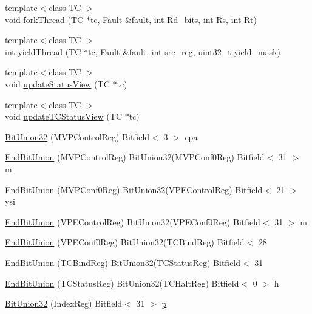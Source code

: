 \begin{DoxyCompactItemize}
\item 
{\footnotesize template$<$class TC $>$ }\\void \hyperlink{namespaceMipsISA_ac90786a66a67e08e3105a5b2f7e8e995}{forkThread} (TC $\ast$tc, \hyperlink{classRefCountingPtr}{Fault} \&fault, int Rd\_\-bits, int Rs, int Rt)
\item 
{\footnotesize template$<$class TC $>$ }\\int \hyperlink{namespaceMipsISA_a93f5e230d4726543a01ed483a2ea4070}{yieldThread} (TC $\ast$tc, \hyperlink{classRefCountingPtr}{Fault} \&fault, int src\_\-reg, \hyperlink{Type_8hh_a435d1572bf3f880d55459d9805097f62}{uint32\_\-t} yield\_\-mask)
\item 
{\footnotesize template$<$class TC $>$ }\\void \hyperlink{namespaceMipsISA_ad0ceebe8e2a7624b4522015586f786d5}{updateStatusView} (TC $\ast$tc)
\item 
{\footnotesize template$<$class TC $>$ }\\void \hyperlink{namespaceMipsISA_a14312b59ae8982e1caf5246e85b2c12b}{updateTCStatusView} (TC $\ast$tc)
\item 
\hyperlink{namespaceMipsISA_a9c38a1dd425d938646c1e57e919ee830}{BitUnion32} (MVPControlReg) Bitfield$<$ 3 $>$ cpa
\item 
\hyperlink{namespaceMipsISA_ad4fdd9ff9306f98fd1cb2811a1ee108f}{EndBitUnion} (MVPControlReg) BitUnion32(MVPConf0Reg) Bitfield$<$ 31 $>$ m
\item 
\hyperlink{namespaceMipsISA_aeff4cebcd774805b052a6d3eaae89d36}{EndBitUnion} (MVPConf0Reg) BitUnion32(VPEControlReg) Bitfield$<$ 21 $>$ ysi
\item 
\hyperlink{namespaceMipsISA_a87885d433cae4e0f9f50680dd02bd7df}{EndBitUnion} (VPEControlReg) BitUnion32(VPEConf0Reg) Bitfield$<$ 31 $>$ m
\item 
\hyperlink{namespaceMipsISA_acdeb651bae709ddc62e0641544f676e8}{EndBitUnion} (VPEConf0Reg) BitUnion32(TCBindReg) Bitfield$<$ 28
\item 
\hyperlink{namespaceMipsISA_a1c829af5069f0e961b7356026c2f45db}{EndBitUnion} (TCBindReg) BitUnion32(TCStatusReg) Bitfield$<$ 31
\item 
\hyperlink{namespaceMipsISA_a6d539c3ccb9c2c4a1092d245f21830ad}{EndBitUnion} (TCStatusReg) BitUnion32(TCHaltReg) Bitfield$<$ 0 $>$ h
\item 
\hyperlink{namespaceMipsISA_a5318fa590b967d1cce26803bf9539c46}{BitUnion32} (IndexReg) Bitfield$<$ 31 $>$ \hyperlink{namespaceMipsISA_a37d3f683959086eac7bcf24a002a9fb8}{p}
\item 

\end{DoxyCompactItemize}
